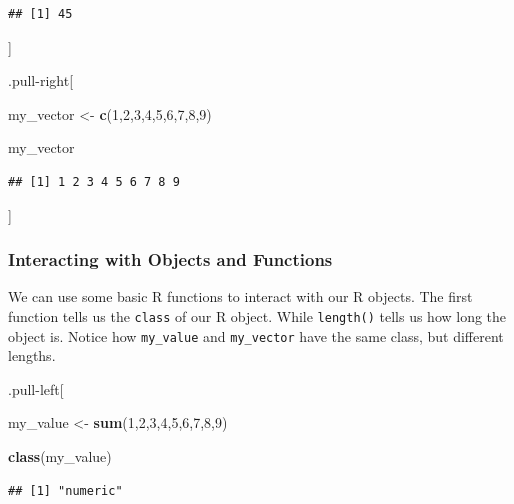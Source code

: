 \documentclass[
]{book}
\newenvironment{Shaded}{\begin{snugshade}}{\end{snugshade}}
\newcommand{\DecValTok}[1]{\textcolor[rgb]{0.00,0.00,0.81}{#1}}
\newcommand{\FunctionTok}[1]{\textcolor[rgb]{0.13,0.29,0.53}{\textbf{#1}}}
\newcommand{\NormalTok}[1]{#1}
\newcommand{\OtherTok}[1]{\textcolor[rgb]{0.56,0.35,0.01}{#1}}
\begin{document}
\begin{verbatim}
## [1] 45
\end{verbatim}

{]}

.pull-right{[}

\begin{Shaded}
\begin{Highlighting}[]
\NormalTok{my\_vector }\OtherTok{\textless{}{-}} \FunctionTok{c}\NormalTok{(}\DecValTok{1}\NormalTok{,}\DecValTok{2}\NormalTok{,}\DecValTok{3}\NormalTok{,}\DecValTok{4}\NormalTok{,}\DecValTok{5}\NormalTok{,}\DecValTok{6}\NormalTok{,}\DecValTok{7}\NormalTok{,}\DecValTok{8}\NormalTok{,}\DecValTok{9}\NormalTok{)}

\NormalTok{my\_vector}
\end{Highlighting}
\end{Shaded}

\begin{verbatim}
## [1] 1 2 3 4 5 6 7 8 9
\end{verbatim}

{]}

\hypertarget{interacting-with-objects-and-functions}{%
\subsubsection{Interacting with Objects and Functions}\label{interacting-with-objects-and-functions}}

We can use some basic R functions to interact with our R objects. The first function tells us the \texttt{class} of our R object. While \texttt{length()} tells us how long the object is. Notice how \texttt{my\_value} and \texttt{my\_vector} have the same class, but different lengths.

.pull-left{[}

\begin{Shaded}
\begin{Highlighting}[]
\NormalTok{my\_value }\OtherTok{\textless{}{-}} \FunctionTok{sum}\NormalTok{(}\DecValTok{1}\NormalTok{,}\DecValTok{2}\NormalTok{,}\DecValTok{3}\NormalTok{,}\DecValTok{4}\NormalTok{,}\DecValTok{5}\NormalTok{,}\DecValTok{6}\NormalTok{,}\DecValTok{7}\NormalTok{,}\DecValTok{8}\NormalTok{,}\DecValTok{9}\NormalTok{)}

\FunctionTok{class}\NormalTok{(my\_value)}
\end{Highlighting}
\end{Shaded}

\begin{verbatim}
## [1] "numeric"
\end{verbatim}
\end{document}
